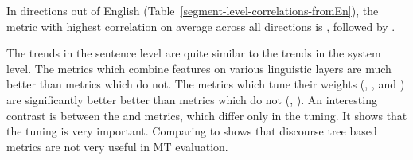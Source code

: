 In directions out of English (Table~\ref{segment-level-correlations-fromEn}),
the metric with highest correlation on average across all directions is
, followed by .

The trends in the sentence level are quite similar to the trends in the system
level. The metrics which combine features on various linguistic layers are much
better than metrics which do not. The metrics which tune their weights
(, ,  and
) are significantly better better than metrics which do not
(, ). An interesting contrast is between the
 and  metrics, which differ
only in the tuning. It shows that the tuning is very important. Comparing 
to  shows that discourse tree based metrics are not very useful in MT evaluation.

